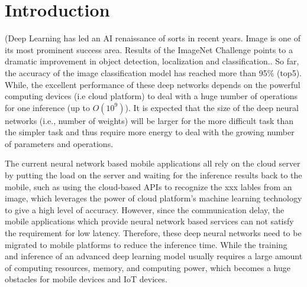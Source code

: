 \section{Introduction}

(Deep Learning has led an AI renaissance of sorts in recent years.
Image is one of its most prominent success area.
Results of the ImageNet Challenge points to a dramatic
improvement in object detection, localization and classification..
So far, the accuracy of the image classification model
has reached more than 95\% (top5)\FIXME{\cite{}}.
While, the excellent performance of these deep networks
depends on the powerful computing devices (i.e cloud platform)
to deal with a huge number of operations
for one inference (up to $O(10^9)$)\FIXME{\cite{}}.
It is expected that the size of the deep neural networks (i.e., number
of weights) will be larger for the more
difficult task than the simpler task and thus require
more energy to deal with the growing number of parameters and operations.


The current neural network based mobile
applications all rely on the cloud server
by putting the load on the server and waiting
for the inference results back to the mobile,
such as \FIXME{\cite{}} using the cloud-based APIs
to recognize the xxx lables from an image,
which leverages the power of cloud platform's machine learning
technology to give a high level of accuracy.
However, since the communication delay, the mobile applications
which provide neural network based services
can not satisfy the requirement for low latency.
Therefore, these deep neural networks
need to be migrated to mobile platforms to reduce the
inference time.
While the training and inference of
an advanced deep learning model usually requires
a large amount of computing resources, memory,
and computing power, which becomes a huge
obstacles for mobile devices and IoT devices.

